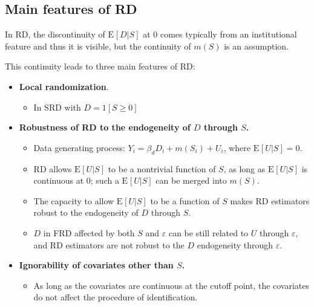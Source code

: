 \documentclass[
]{ctexart}
\providecommand{\tightlist}{%
  \setlength{\itemsep}{0pt}\setlength{\parskip}{0pt}}
\def\ve{\varepsilon}
\newcommand{\0}{\textbf 0}
\newcommand{\1}{\textbf 1}
\providecommand{\e}{}\renewcommand{\e}[2][]{\text{E}_{#1}\br{#2}}
\def\br#1{\left[#1\right]}
\def\pr#1{\left(#1\right)}
\begin{document}
\hypertarget{main-features-of-rd}{%
\subsection{Main features of RD}\label{main-features-of-rd}}

In RD, the discontinuity of \(\e{D|S}\) at \(0\) comes typically from an
institutional feature and thus it is visible, but the continuity of
\(m\pr{S}\) is an assumption.

This continuity leads to three main features of RD:

\begin{itemize}
\tightlist
\item
  \textbf{Local randomization}.

  \begin{itemize}
  \tightlist
  \item
    In SRD with \(D = 1\br{S\ge 0}\)
  \end{itemize}
\item
  \textbf{Robustness of RD to the endogeneity of \(D\) through \(S\).}

  \begin{itemize}
  \tightlist
  \item
    Data generating process: \(Y_i = \beta_d D_i+m\pr{S_i}+U_i\), where
    \(\e{U|S} = 0\).
  \item
    RD allows \(\e{U|S}\) to be a nontrivial function of \(S\), as long
    as \(\e{U|S}\) is continuous at \(0\); such a \(\e{U|S}\) can be
    merged into \(m\pr{S}\).
  \item
    The capacity to allow \(\e{U|S}\) to be a function of \(S\) makes RD
    estimators robust to the endogeneity of \(D\) through \(S\).
  \item
    \(D\) in FRD affected by both \(S\) and \(\ve\) can be still related
    to \(U\) through \(\ve\), and RD estimators are not robust to the
    \(D\) endogeneity through \(\ve\).
  \end{itemize}
\item
  \textbf{Ignorability of covariates other than \(S\).}

  \begin{itemize}
  \tightlist
  \item
    As long as the covariates are continuous at the cutoff point, the
    covariates do not affect the procedure of identification.
  \end{itemize}
\end{itemize}
\end{document}
